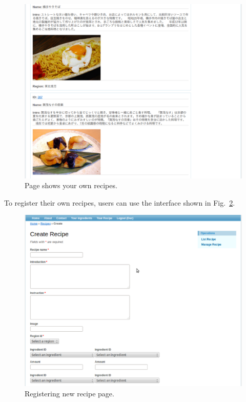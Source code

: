 \begin{figure}
\centering
\includegraphics[scale=0.5]{your_recipe.eps}
\caption{Page shows your own recipes.}
\label{fig:precipitous}
\end{figure}

To register their own recipes, users can use the interface shown in Fig.~\ref{fig:register_recipe}.
 
\begin{figure}
\centering
\includegraphics[scale=0.5]{register_recipe.eps}
\caption{Registering new recipe page.}
\label{fig:register_recipe}
\end{figure}

